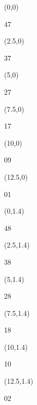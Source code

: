 \documentclass[a4paper]{article}
\newcommand{\myseat}[4]{%
	\vspace{0.1cm}
	\parbox[t][2.5cm][t]{3.5cm}{
	\small #1 %
	\begin{description}
	\vspace{-0.1cm}
	\item [ID:] #2
	\vspace{-0.1cm}
	\item [Team:] #3 \normalsize
	\vspace{-0.1cm}
	\item \normalsize #4
	\vspace{-0.1cm}
	\end{description}
	}
}
\begin{document}
\begin{textblock}{2.5}(0,0)
\textblockcolor{}
\myseat{47}{}{}{}
\end{textblock}

\begin{textblock}{2.5}(2.5,0)
\textblockcolor{}
\myseat{37}{}{}{}
\end{textblock}

\begin{textblock}{2.5}(5,0)
\textblockcolor{}
\myseat{27}{}{}{}
\end{textblock}

\begin{textblock}{2.5}(7.5,0)
\textblockcolor{}
\myseat{17}{}{}{}
\end{textblock}

\begin{textblock}{2.5}(10,0)
\textblockcolor{}
\myseat{09}{}{}{}
\end{textblock}

\begin{textblock}{2.5}(12.5,0)
\textblockcolor{}
\myseat{01}{}{}{}
\end{textblock}


\begin{textblock}{2.5}(0,1.4)
\textblockcolor{}
	\myseat{48}{}{}{}
\end{textblock}

\begin{textblock}{2.5}(2.5,1.4)
\textblockcolor{}
	\myseat{38}{}{}{}
\end{textblock}

\begin{textblock}{2.5}(5,1.4)
\textblockcolor{}
	\myseat{28}{}{}{}
\end{textblock}

\begin{textblock}{2.5}(7.5,1.4)
\textblockcolor{}
	\myseat{18}{}{}{}
\end{textblock}

\begin{textblock}{2.5}(10,1.4)
\textblockcolor{}
	\myseat{10}{}{}{}
\end{textblock}

\begin{textblock}{2.5}(12.5,1.4)
\textblockcolor{}
	\myseat{02}{}{}{}
\end{textblock}
\end{document}
